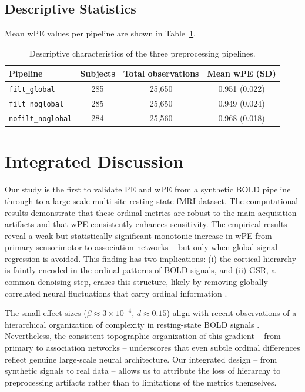 \documentclass[12pt,a4paper]{article}
\begin{document}
	\subsection{Descriptive Statistics}
	Mean wPE values per pipeline are shown in Table~\ref{tab:descriptivos}.
	
	\begin{table}[htbp]
		\centering
		\caption{Descriptive characteristics of the three preprocessing pipelines.}
		\label{tab:descriptivos}
		\begin{tabular}{@{}lccc@{}}
			\toprule
			Pipeline & Subjects & Total observations & Mean wPE (SD) \\ \midrule
			\texttt{filt\_global}   & 285 & 25,650 & 0.951 (0.022) \\
			\texttt{filt\_noglobal} & 285 & 25,650 & 0.949 (0.024) \\
			\texttt{nofilt\_noglobal} & 284 & 25,560 & 0.968 (0.018) \\ \bottomrule
		\end{tabular}
	\end{table}
	
	\section{Integrated Discussion}
	
	Our study is the first to validate PE and wPE from a synthetic BOLD pipeline through to a large‑scale multi‑site resting‑state fMRI dataset. The computational results demonstrate that these ordinal metrics are robust to the main acquisition artifacts and that wPE consistently enhances sensitivity. The empirical results reveal a weak but statistically significant monotonic increase in wPE from primary sensorimotor to association networks – but only when global signal regression is avoided. This finding has two implications: (i) the cortical hierarchy is faintly encoded in the ordinal patterns of BOLD signals, and (ii) GSR, a common denoising step, erases this structure, likely by removing globally correlated neural fluctuations that carry ordinal information \cite{murphy2009, saad2012}.
	
	The small effect sizes ($\beta \approx 3\times10^{-4}$, $d \approx 0.15$) align with recent observations of a hierarchical organization of complexity in resting-state BOLD signals \cite{trevino2024}. Nevertheless, the consistent topographic organization of this gradient – from primary to association networks – underscores that even subtle ordinal differences reflect genuine large‑scale neural architecture. Our integrated design – from synthetic signals to real data – allows us to attribute the loss of hierarchy to preprocessing artifacts rather than to limitations of the metrics themselves.
	
\end{document}
